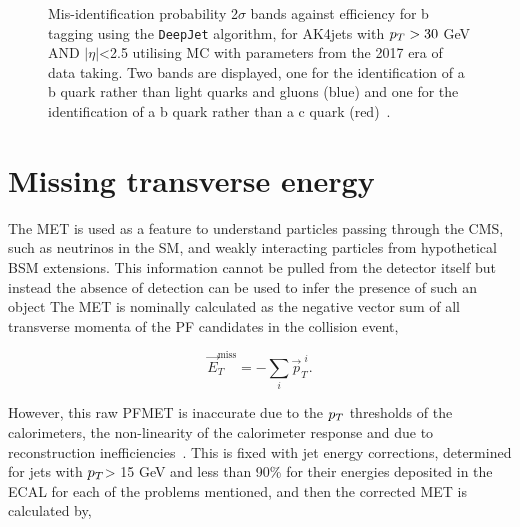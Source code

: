 \begin{figure}[!hbtp]
\centering
\caption{Mis-identification probability 2$\sigma$ bands against efficiency for b tagging using the \texttt{DeepJet} algorithm, for AK4jets with $p_{T}> 30$ GeV AND $|\eta|$<2.5 utilising MC with parameters from the 2017 era of data taking. Two bands are displayed, one for the identification of a b quark rather than light quarks and gluons (blue) and one for the identification of a b quark rather than a c quark (red)~\cite{deepjet}.}
\label{fig:deeptau_misid}
\end{figure}

\section{Missing transverse energy}

The \ac{MET} is used as a feature to understand particles passing through the \ac{CMS}, such as neutrinos in the \ac{SM}, and weakly interacting particles from hypothetical \ac{BSM} extensions.
This information cannot be pulled from the detector itself but instead the absence of detection can be used to infer the presence of such an object
The \ac{MET} is nominally calculated as the negative vector sum of all transverse momenta of the \ac{PF} candidates in the collision event,

\begin{equation}
\vec{E}_{T}^{\text{miss}} = - \sum_{i} \vec{p}_{T}^{\hspace{4pt}i}.
\end{equation}

However, this raw \ac{PF}\ac{MET} is inaccurate due to the $p_{T}$ thresholds of the calorimeters, the non-linearity of the calorimeter response and due to reconstruction inefficiencies~\cite{CMS:2016ljj}.
This is fixed with jet energy corrections, determined for jets with $p_{T}$> 15 GeV and less than 90\% for their energies deposited in the \ac{ECAL} for each of the problems mentioned, and then the corrected \ac{MET} is calculated by,

